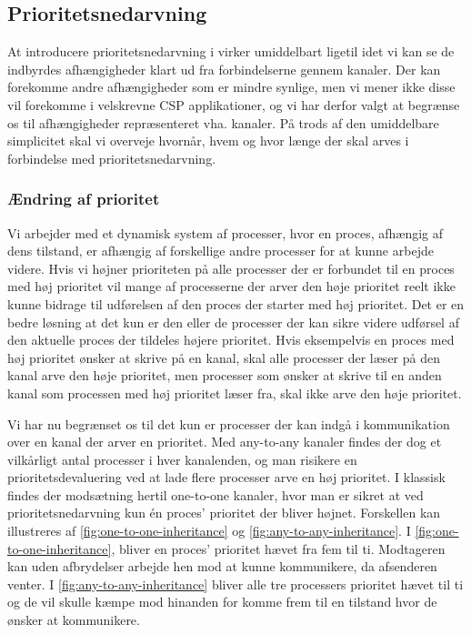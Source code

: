 \subsection{Prioritetsnedarvning}
At introducere prioritetsnedarvning i \pycsp virker umiddelbart ligetil idet vi kan se de indbyrdes afhængigheder klart ud fra forbindelserne gennem kanaler. Der kan forekomme andre afhængigheder som er mindre synlige, men vi mener ikke disse vil forekomme i velskrevne CSP applikationer, og vi har derfor valgt at begrænse os til afhængigheder repræsenteret vha. kanaler. På trods af den umiddelbare simplicitet skal vi overveje hvornår, hvem og hvor længe der skal arves i forbindelse med prioritetsnedarvning.

\subsubsection*{Ændring af prioritet}
Vi arbejder med et dynamisk system af processer, hvor en proces, afhængig af dens tilstand, er afhængig af forskellige andre processer for at kunne arbejde videre. 
Hvis vi højner prioriteten på alle processer der er forbundet til en proces med høj prioritet vil mange af processerne der arver den høje prioritet reelt ikke kunne bidrage til udførelsen af den proces der starter med høj prioritet. Det er en bedre løsning at det kun er den eller de processer der kan sikre videre udførsel af den aktuelle proces der tildeles højere prioritet. Hvis eksempelvis en proces med høj prioritet ønsker at skrive på en kanal, skal alle processer der læser på den kanal arve den høje prioritet, men processer som ønsker at skrive til en anden kanal som processen med høj prioritet læser fra, skal ikke arve den høje prioritet. 

Vi har nu begrænset os til det kun er  processer der kan indgå i kommunikation over en kanal der arver en prioritet. Med any-to-any kanaler findes der dog et vilkårligt antal processer i hver kanalenden, og man risikere en  prioritetsdevaluering ved at lade flere processer arve en høj prioritet. I klassisk \csp findes der modsætning hertil one-to-one kanaler, hvor man er sikret at ved prioritetsnedarvning kun én proces' prioritet der bliver højnet. Forskellen kan illustreres af \autoref{fig:one-to-one-inheritance} og \cref{fig:any-to-any-inheritance}. I \autoref{fig:one-to-one-inheritance}, bliver en proces' prioritet hævet fra fem til ti. Modtageren kan uden afbrydelser arbejde hen mod at kunne kommunikere, da afsenderen venter. I \autoref{fig:any-to-any-inheritance} bliver alle tre processers prioritet hævet til ti og de vil skulle kæmpe mod hinanden for komme frem til en tilstand hvor de ønsker at kommunikere. 

